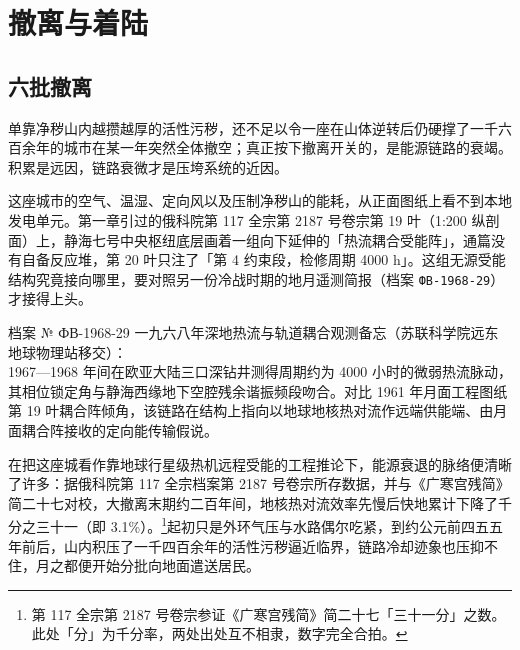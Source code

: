 \chapter{撤离与着陆}


\section{六批撤离}

单靠净秽山内越攒越厚的活性污秽，还不足以令一座在山体逆转后仍硬撑了一千六百余年的城市在某一年突然全体撤空；真正按下撤离开关的，是能源链路的衰竭。积累是远因，链路衰微才是压垮系统的近因。

这座城市的空气、温湿、定向风以及压制净秽山的能耗，从正面图纸上看不到本地发电单元。第一章引过的俄科院第 117 全宗第 2187 号卷宗第 19 叶（1:200 纵剖面）上，静海七号中央枢纽底层画着一组向下延伸的「热流耦合受能阵」，通篇没有自备反应堆，第 20 叶只注了「第 4 约束段，检修周期 4000 h」。这组无源受能结构究竟接向哪里，要对照另一份冷战时期的地月遥测简报（档案 \texttt{ФВ-1968-29}）才接得上头。

\begin{archive}[内部参考]{档案 № ФВ-1968-29}
一九六八年深地热流与轨道耦合观测备忘（苏联科学院远东地球物理站移交）：\\
1967—1968 年间在欧亚大陆三口深钻井测得周期约为 4000 小时的微弱热流脉动，其相位锁定角与静海西缘地下空腔残余谐振频段吻合。对比 1961 年月面工程图纸第 19 叶耦合阵倾角，该链路在结构上指向以地球地核热对流作远端供能端、由月面耦合阵接收的定向能传输假说。
\end{archive}

在把这座城看作靠地球行星级热机远程受能的工程推论下，能源衰退的脉络便清晰了许多：据俄科院第 117 全宗档案第 2187 号卷宗所存数据，并与《广寒宫残简》简二十七对校，大撤离末期约二百年间，地核热对流效率先慢后快地累计下降了千分之三十一（即 3.1\%）。\footnote{第 117 全宗第 2187 号卷宗参证《广寒宫残简》简二十七「三十一分」之数。此处「分」为千分率，两处出处互不相隶，数字完全合拍。}起初只是外环气压与水路偶尔吃紧，到约公元前四五五年前后，山内积压了一千四百余年的活性污秽逼近临界，链路冷却迹象也压抑不住，月之都便开始分批向地面遣送居民。

